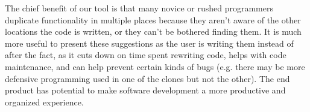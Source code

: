 \documentclass[preprint,10pt]{sigplanconf}
\begin{document}
The chief benefit of our tool is that many novice or rushed programmers duplicate functionality in multiple places because they aren't aware of the other locations the code is written, or they can't be bothered finding them. It is much more useful to present these suggestions as the user is writing them instead of after the fact, as it cuts down on time spent rewriting code, helps with code maintenance, and can help prevent certain kinds of bugs (e.g. there may be more defensive programming used in one of the clones but not the other).  The end product has potential to make software development a more productive and organized experience.


%

%
%
\end{document}
